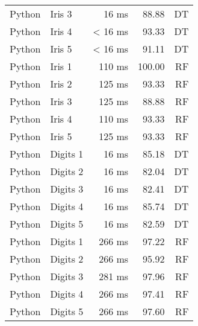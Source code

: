 \begin{longtable}{llrrr}
  Python & Iris 3               & 16 ms               &  88.88  & DT  \\
  Python & Iris 4               & < 16 ms               &  93.33  & DT  \\
  Python & Iris 5               & < 16 ms               &  91.11  & DT  \\
  \addlinespace
  Python & Iris 1               & 110 ms               &  100.00  & RF  \\
  Python & Iris 2               & 125 ms              &  93.33  & RF  \\
  Python & Iris 3               & 125 ms              &  88.88  & RF  \\
  Python & Iris 4               & 110 ms               &  93.33  & RF  \\
  Python & Iris 5               & 125 ms               &  93.33  & RF  \\
  \addlinespace
  Python & Digits 1               & 16 ms               &  85.18  & DT  \\
  Python & Digits 2               & 16 ms               &  82.04  & DT  \\
  Python & Digits 3               & 16 ms               &  82.41  & DT  \\
  Python & Digits 4               & 16 ms               &  85.74  & DT  \\
  Python & Digits 5               & 16 ms               &  82.59  & DT  \\
  \addlinespace
  Python & Digits 1               & 266 ms               &  97.22 & RF   \\
  Python & Digits 2               & 266 ms               &  95.92 & RF   \\
  Python & Digits 3               & 281 ms               &  97.96 & RF   \\
  Python & Digits 4               & 266 ms               &  97.41  & RF  \\
  Python & Digits 5               & 266 ms               &  97.60  & RF  \\
\hline 
\end{longtable}


